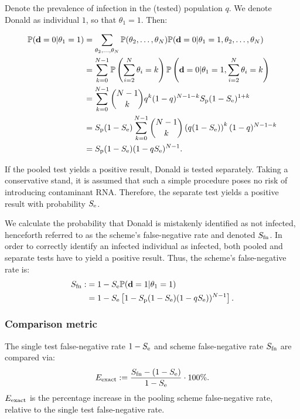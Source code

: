 \documentclass{article}
\begin{document}
Denote the prevalence of infection in the (tested) population $q$. We
denote Donald as individual $1$, so that $\theta_1=1$. Then:

\begin{align}
  \begin{split}
    \mathbb{P}(\mathbf{d}=0|\theta_1=1) &= \sum_{\theta_2,\dots,\theta_N}
    \mathbb{P}(\theta_2,\dots,\theta_N)
    \mathbb{P}(\mathbf{d}=0|\theta_1=1,\theta_2,\dots,\theta_N) \\
    &= \sum_{k=0}^{N-1}\mathbb{P}\left(\sum_{i=2}^N\theta_i=k\right)
    \mathbb{P}\left(\mathbf{d}=0|\theta_1=1,\sum_{i=2}^N\theta_i = k\right)\\
    &= \sum_{k=0}^{N-1}\binom{N-1}{k}q^k(1-q)^{N-1-k} S_\text{p}(1-S_\text{e})^{1+k}\\
    &= S_\text{p}(1-S_\text{e}) \sum_{k=0}^{N-1}\binom{N-1}{k}
    \left(q(1-S_\text{e})\right)^k(1-q)^{N-1-k}\\
    &= S_\text{p}(1-S_\text{e})(1-qS_\text{e})^{N-1}. \\
  \end{split}
\end{align}

If the pooled test yields a positive result, Donald is tested
separately. Taking a conservative stand, it is assumed that such a
simple procedure poses no risk of introducing contaminant
RNA. Therefore, the separate test yields a positive result with
probability $S_\text{e}$.

We calculate the probability that Donald is mistakenly identified as
not infected, henceforth referred to as the scheme's false-negative
rate and denoted $S_{\text{fn}}$. In order to correctly identify an infected
individual as infected, both pooled and separate tests have to yield a
positive result. Thus, the scheme's false-negative rate is:
\begin{align}\label{eq:sfn}
    \begin{split}
        S_{\text{fn}} :&= 1 - S_\text{e}\mathbb{P}(\mathbf{d}=1|\theta_1=1)\\
        &= 1 - S_\text{e}\left [1 - S_\text{p}(1-S_\text{e})(1-qS_\text{e}))^{N-1}\right].
    \end{split}
\end{align}

\subsubsection*{Comparison metric}
The single test false-negative rate $1-S_\text{e}$ and scheme false-negative
rate $S_{\text{fn}}$ are compared via:
\begin{equation}\label{eq:erel}
E_{\text{{exact}}} := \frac{S_{\text{fn}} - (1-S_\text{e})}{1-S_\text{e}} \cdot 100\%.
\end{equation}
$E_{\text{{exact}}}$ is the percentage increase in the pooling scheme
false-negative rate, relative to the single test false-negative rate.
\end{document}
